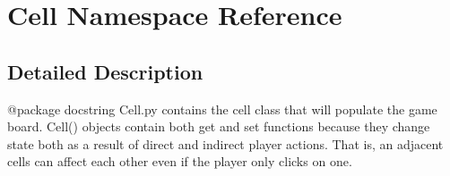 \hypertarget{namespace_cell}{}\section{Cell Namespace Reference}
\label{namespace_cell}


\subsection{Detailed Description}
\begin{DoxyVerb}@package docstring
   Cell.py contains the cell class that will populate the game board. Cell()
   objects contain both get and set functions because they change state both
   as a result of direct and indirect player actions. That is, an adjacent cells
   can affect each other even if the player only clicks on one.
\end{DoxyVerb}
 
